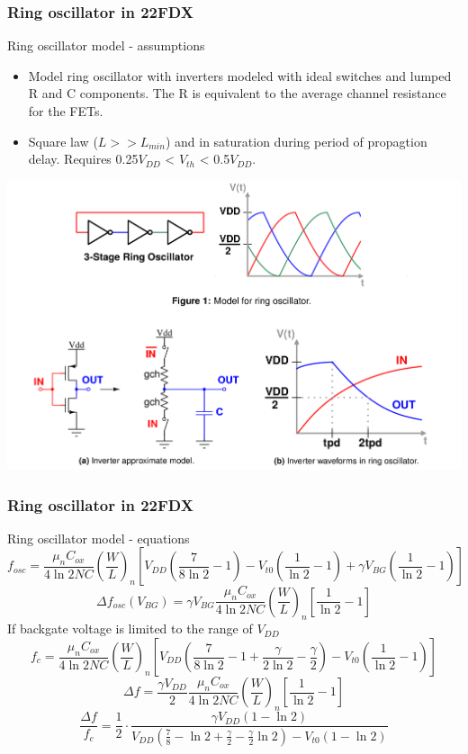 \documentclass[t, screen, aspectratio=43]{beamer}
\begin{document}
\begin{frame}
	\frametitle{Ring oscillator in 22FDX}
	\begin{block}{Ring oscillator model - assumptions}
		\begin{itemize}
			\scriptsize
			\item Model ring oscillator with inverters modeled with ideal switches and lumped R and C components. The R is equivalent to the average channel resistance for the FETs.
			\item Square law ($L>>L_{min}$) and in saturation during period of propagtion delay. Requires 0.25$V_{DD}$ < $V_{th}$ < 0.5$V_{DD}$.
		\end{itemize}    
		\center\includegraphics[width=0.5\linewidth]{ro_model_fig.png}
	\end{block}
\end{frame}


\begin{frame}
	\frametitle{Ring oscillator in 22FDX}
	\begin{block}{Ring oscillator model - equations}
	\scriptsize
	\vspace{-1em}
	\begin{equation}
		f_{osc} = \frac{\mu_nC_{ox}}{4\ln2NC}\left(\frac{W}{L}\right)_n\left[V_{DD}\left(\frac{7}{8\ln2}-1\right)-V_{t0}\left(\frac{1}{\ln2}-1\right) + \gamma V_{BG}\left(\frac{1}{\ln2}-1\right) \right]
	\end{equation}
	\begin{equation}
		\Delta f_{osc}(V_{BG}) = \gamma V_{BG}\frac{\mu_nC_{ox}}{4\ln2NC}\left(\frac{W}{L}\right)_n\left[\frac{1}{\ln2}-1\right]
	\end{equation}	
	If backgate voltage is limited to the range of $V_{DD}$
	\begin{equation}
		f_{c} = \frac{\mu_nC_{ox}}{4\ln2NC}\left(\frac{W}{L}\right)_n\left[V_{DD}\left(\frac{7}{8\ln2}-1+\frac{\gamma}{2\ln2}-\frac{\gamma}{2}\right)-V_{t0}\left(\frac{1}{\ln2}-1\right)\right]
	\end{equation}
	\begin{equation}
		\Delta f = \frac{\gamma V_{DD}}{2}\frac{\mu_nC_{ox}}{4\ln2NC}\left(\frac{W}{L}\right)_n\left[\frac{1}{\ln2}-1\right]
	\end{equation}
	\begin{equation}
		\frac{\Delta f}{f_c} = \frac{1}{2}\cdot\frac{\gamma V_{DD}\left( 1-\ln2 \right)}{V_{DD}\left(\frac{7}{8}-\ln2+\frac{\gamma}{2}-\frac{\gamma}{2}\ln2\right)-V_{t0}\left(1-\ln2\right)}
	\end{equation}	  
	\end{block}
\end{frame}
\end{document}
